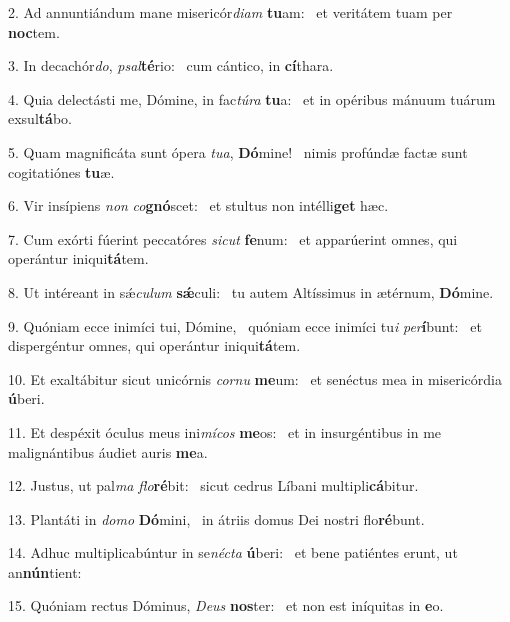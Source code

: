 2. Ad annuntiándum mane misericór\textit{di}\textit{am} \textbf{tu}am: \ast\  et veritátem tuam per \textbf{noc}tem.\

3. In decachór\textit{do}, \textit{psal}\textbf{té}rio: \ast\  cum cántico, in \textbf{cí}thara.\

4. Quia delectásti me, Dómine, in fac\textit{tú}\textit{ra} \textbf{tu}a: \ast\  et in opéribus mánuum tuárum exsul\textbf{tá}bo.\

5. Quam magnificáta sunt ópera \textit{tu}\textit{a}, \textbf{Dó}mine! \ast\  nimis profúndæ factæ sunt cogitatiónes \textbf{tu}æ.\

6. Vir insípiens \textit{non} \textit{co}\textbf{gnó}scet: \ast\  et stultus non intélli\textbf{get} hæc.\

7. Cum exórti fúerint peccatóres \textit{sic}\textit{ut} \textbf{fe}num: \ast\  et apparúerint omnes, qui operántur iniqui\textbf{tá}tem.\

8. Ut intéreant in sǽ\textit{cu}\textit{lum} \textbf{sǽ}culi: \ast\  tu autem Altíssimus in ætérnum, \textbf{Dó}mine.\

9. Quóniam ecce inimíci tui, Dómine, \dag\  quóniam ecce inimíci tu\textit{i} \textit{per}\textbf{í}bunt: \ast\  et dispergéntur omnes, qui operántur iniqui\textbf{tá}tem.\

10. Et exaltábitur sicut unicórnis \textit{cor}\textit{nu} \textbf{me}um: \ast\  et senéctus mea in misericórdia \textbf{ú}beri.\

11. Et despéxit óculus meus ini\textit{mí}\textit{cos} \textbf{me}os: \ast\  et in insurgéntibus in me malignántibus áudiet auris \textbf{me}a.\

12. Justus, ut pal\textit{ma} \textit{flo}\textbf{ré}bit: \ast\  sicut cedrus Líbani multipli\textbf{cá}bitur.\

13. Plantáti in \textit{do}\textit{mo} \textbf{Dó}mini, \ast\  in átriis domus Dei nostri flo\textbf{ré}bunt.\

14. Adhuc multiplicabúntur in se\textit{néc}\textit{ta} \textbf{ú}beri: \ast\  et bene patiéntes erunt, ut an\textbf{nún}tient:\

15. Quóniam rectus Dóminus, \textit{De}\textit{us} \textbf{nos}ter: \ast\  et non est iníquitas in \textbf{e}o.\

